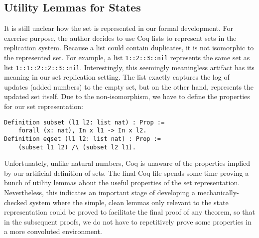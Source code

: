 \documentclass[twocolumn]{article}
\begin{document}
\subsection{Utility Lemmas for States}
It is still unclear how the set is represented in our formal development. For
exercise purpose, the author decides to use Coq lists to represent sets in the
replication system. Because a list could contain duplicates, it is not
isomorphic to the represented set. For example, a list \texttt{1::2::3::nil}
represents the same set as list \texttt{1::1::2::2::3::nil}. Interestingly,
this seemingly meaningless artifact has its meaning in our set replication
setting. The list exactly captures the log of updates (added numbers) to the
empty set, but on the other hand, represents the updated set itself.
Due to the non-isomorphism, we have to define the properties for our set representation:
\begin{center}
\small
\begin{verbatim}
Definition subset (l1 l2: list nat) : Prop :=
    forall (x: nat), In x l1 -> In x l2.
Definition eqset (l1 l2: list nat) : Prop :=
    (subset l1 l2) /\ (subset l2 l1).
\end{verbatim}
\end{center}
Unfortunately, unlike natural numbers, Coq is unaware of the properties implied
by our artificial definition of sets. The final Coq file spends some time
proving a bunch of utility lemmas about the useful properties of the set
representation.  Nevertheless, this indicates an important stage of developing
a mechanically-checked system where the simple, clean lemmas only relevant to
the state representation could be proved to facilitate the final proof of any
theorem, so that in the subsequent proofs, we do not have to repetitively prove
some properties in a more convoluted environment.
\end{document}
